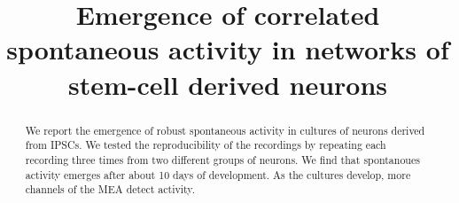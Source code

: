 \documentclass[doublespacing]{bmcart}
\begin{document}
\begin{frontmatter}

\begin{fmbox}

\title{Emergence of correlated spontaneous activity in networks of stem-cell derived neurons}

\author[
   addressref={aff1},
   noteref={n1}
]{ }
\author[
   addressref={aff2},
   noteref={n1}
]{ }
\author[
   addressref={aff1},
]{ }
\author[addressref={aff1},noteref={n2}]{
   }
\author[addressref={aff1},noteref={n2}]{
   }
\author[
   addressref={aff2},
   noteref={n2},
   email={sje30@cam.ac.uk}
]{ }

\address[id=aff1]{
    ,
    ,
    ,
}

\address[id=aff2]{
    ,
    ,
    ,
}

\begin{artnotes}


\end{artnotes}

\end{fmbox}

\begin{abstractbox}

\begin{abstract}

We report the emergence of robust spontaneous activity in cultures of
neurons derived from IPSCs.  We tested the reproducibility of the recordings by repeating each recording three times from two different groups of neurons.  We find that spontanoues activity emerges after about 10 days of development.  As the cultures develop, more channels of the MEA detect activity.  

\end{abstract}

\begin{keyword}



\end{keyword}
\end{abstractbox}
\end{frontmatter}
\end{document}
